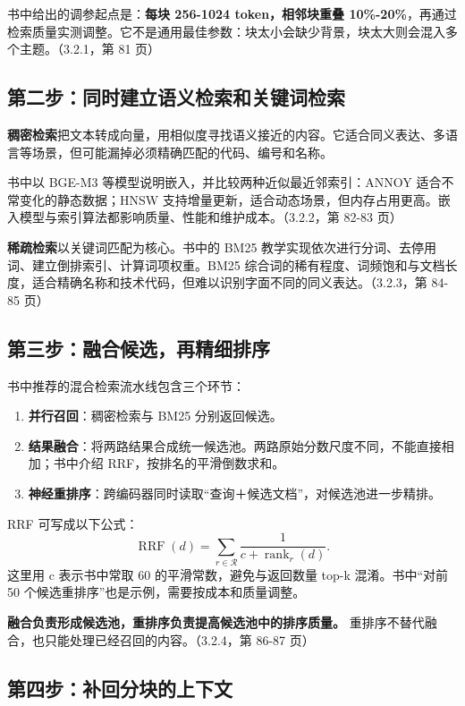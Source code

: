 \documentclass[UTF8,a4paper,11pt]{ctexart}
\newcommand{\code}[1]{{\small\ttfamily #1}}
\begin{document}
书中给出的调参起点是：\textbf{每块 256-1024 token，相邻块重叠 10\%-20\%}，再通过检索质量实测调整。它不是通用最佳参数：块太小会缺少背景，块太大则会混入多个主题。（3.2.1，第 81 页）

\subsection{第二步：同时建立语义检索和关键词检索}

\textbf{稠密检索}把文本转成向量，用相似度寻找语义接近的内容。它适合同义表达、多语言等场景，但可能漏掉必须精确匹配的代码、编号和名称。

书中以 BGE-M3 等模型说明嵌入，并比较两种近似最近邻索引：ANNOY 适合不常变化的静态数据；HNSW 支持增量更新，适合动态场景，但内存占用更高。嵌入模型与索引算法都影响质量、性能和维护成本。（3.2.2，第 82-83 页）

\textbf{稀疏检索}以关键词匹配为核心。书中的 BM25 教学实现依次进行分词、去停用词、建立倒排索引、计算词项权重。BM25 综合词的稀有程度、词频饱和与文档长度，适合精确名称和技术代码，但难以识别字面不同的同义表达。（3.2.3，第 84-85 页）

\subsection{第三步：融合候选，再精细排序}

书中推荐的混合检索流水线包含三个环节：

\begin{enumerate}
\item \textbf{并行召回}：稠密检索与 BM25 分别返回候选。
\item \textbf{结果融合}：将两路结果合成统一候选池。两路原始分数尺度不同，不能直接相加；书中介绍 RRF，按排名的平滑倒数求和。
\item \textbf{神经重排序}：跨编码器同时读取“查询＋候选文档”，对候选池进一步精排。
\end{enumerate}

RRF 可写成以下公式：
\[\operatorname{RRF}(d)=\sum_{r\in\mathcal{R}}\frac{1}{c+\operatorname{rank}_{r}(d)}.\]
这里用 \code{c} 表示书中常取 60 的平滑常数，避免与返回数量 \code{top-\allowbreak k} 混淆。书中“对前 50 个候选重排序”也是示例，需要按成本和质量调整。

\textbf{融合负责形成候选池，重排序负责提高候选池中的排序质量。} 重排序不替代融合，也只能处理已经召回的内容。（3.2.4，第 86-87 页）

\subsection{第四步：补回分块的上下文}
\end{document}
